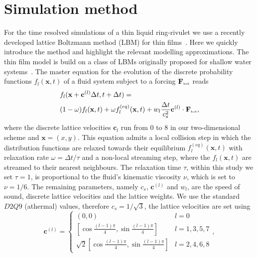 \documentclass[twoside,twocolumn,9pt]{article}
\begin{document}
\section{Simulation method}
\label{sec:method}
For the time resolved simulations of a thin liquid ring-rivulet we use a recently developed lattice Boltzmann method (LBM) for thin films~\cite{zitzLatticeBoltzmannMethod2019, zitzLatticeBoltzmannSimulations2021, zitzSwalbeJlLattice2022, zitzControllingDewettingMorphologies2023}. 
Here we quickly introduce the method and highlight the relevant modelling approximations.
The thin film model is build on a class of LBMs originally proposed for shallow water systems~\cite{salmonLatticeBoltzmannMethod1999, dellarNonhydrodynamicModesPriori2002}.
The master equation for the evolution of the discrete probability functions $f_l(\mathbf{x},t)$ of a fluid system subject to a forcing $\mathbf{F}_{\mbox{\tiny{tot}}}$ reads
\begin{equation}\label{eq:LBE}
\begin{split}
&f_l(\mathbf{x}+\mathbf{c}^{(l)}\Delta t,t+\Delta t) = \\
&(1 - \omega) f_l(\mathbf{x},t) + \omega f_l^{(eq)}(\mathbf{x},t) + w_l \frac{\Delta t}{c_s^2} \mathbf{c}^{(l)} \cdot \mathbf{F}_{\mbox{\tiny{tot}}},
\end{split}
\end{equation}
where the discrete lattice velocities $\mathbf{c}_l$ run from $0$ to $8$ in our two-dimensional scheme and $\mathbf{x} = (x,y)$.
This equation admits a local collision step in which the distribution functions are relaxed towards their equilibrium $f_l^{(eq)}(\mathbf{x},t)$ with relaxation rate $\omega = \Delta t/\tau$ and a non-local streaming step, where the $f_l(\mathbf{x},t)$ are streamed to their nearest neighbours.
The relaxation time $\tau$, within this study we set $\tau = 1$, is proportional to the fluid's kinematic viscosity $\nu$, which is set to $\nu = 1/6$.  
The remaining parameters, namely $c_s$, $\mathbf{c}^{(l)}$ and $w_l$, are the speed of sound, discrete lattice velocities and the lattice weights. 
We use the standard $D2Q9$ (athermal) values, therefore $c_s = 1/\sqrt{3}$, the lattice velocities are set using~\cite{krugerLatticeBoltzmannMethod2017, zitzLatticeBoltzmannMethod2019, salmonLatticeBoltzmannMethod1999}   
\begin{equation}\label{eq:speeds}
\mathbf{c}^{(l)}  =
\left\{
\begin{array}{ll}
(0,0) & l = 0 \\
\left[\cos{\frac{(l-1)\pi}{4}}, \sin{\frac{(l-1)\pi}{4}} \right] &  l=1,3,5,7 \\
\sqrt{2}\left[\cos{\frac{(l-1)\pi}{4}}, \sin{\frac{(l-1)\pi}{4}} \right] & l=2,4,6,8
\end{array}
\right.,
\end{equation}
\end{document}
